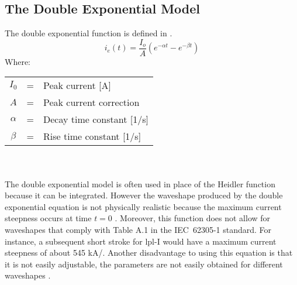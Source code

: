 \subsection{The Double Exponential Model}
\label{sub:background_double_exponential}
The double exponential function is defined in .
\begin{equation}
    i_e \left( t \right) = \frac{I_o}{A}\left( e^{-\alpha t} - e^{-\beta t} \right)
    \label{eqn:dexp}
\end{equation}
Where: \\
\begin{tabular}{cll}
    $I_0$ & = & Peak current [A] \\
    $A$ & = & Peak current correction \\
    $\alpha$ & = & Decay time constant [1/s] \\
    $\beta$ & = & Rise time constant [1/s]
\end{tabular}\\\\
The double exponential model is often used in place of the Heidler function because it can be integrated. However the waveshape produced by the double exponential equation is not physically realistic because the maximum current steepness occurs at time $t=0$ \cite{ZhangFeizhouandLiuShanghe2002,Lovric2013,Heidler2002,Delfino2012}. Moreover, this function does not allow for waveshapes that comply with Table A.1 in the IEC~62305-1 standard. For instance, a subsequent short stroke for \gls{lpl}-I would have a maximum current steepness of about 545 kA/\usec \cite{Heidler2008}. Another disadvantage to using this equation is that it is not easily adjustable, the parameters are not easily obtained for different waveshapes \cite{Javor2011}.

